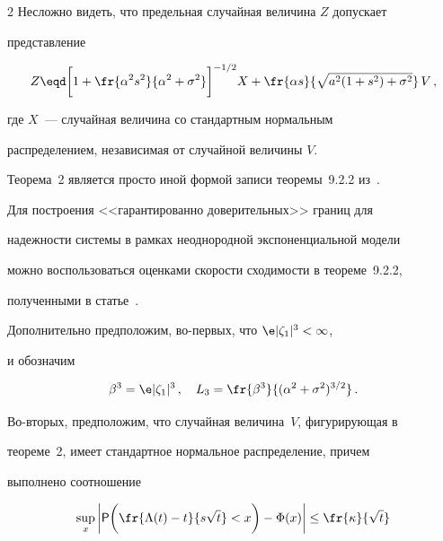 \begin{multicols}{2}
Несложно видеть, что предельная случайная величина $Z$ допускает


представление


$$


Z\eqd


\bigg[1+\fr{\alpha^2s^2}{\alpha^2+\sigma^2}\bigg]^{-1/2}


X+\fr{\alpha s}{\sqrt{a^2(1+s^2)+\sigma^2}}\, V\,,


$$


где $X$~--- случайная величина со стандартным нормальным


распределением, независимая от случайной величины $V$.





Теорема~2 является просто иной формой записи теоремы~9.2.2 из~\cite{8art}.





\smallskip





Для построения <<гарантированно доверительных>> границ для


надежности системы в рамках неоднородной экспоненциальной модели


можно воспользоваться оценками скорости сходимости в теореме~9.2.2,


полученными в статье~\cite{10art}.





Дополнительно предположим, во-первых, что $\e|\zeta_1|^3<\infty$,


и обозначим


$$


\beta^3 = \e|\zeta_1|^3\,,\ \ \ L_3 =


\fr{\beta^3}{(\alpha^2+\sigma^2)^{3/2}}\,.


$$


Во-вторых, предположим, что случайная величина~$V$, фигурирующая в


теореме~2, имеет стандартное нормальное распределение, причем


выполнено соотношение


\begin{equation}


\sup_x\bigg|{\sf P}\bigg(\fr{\Lambda(t)-t}{s\sqrt


t}<x\bigg)-\Phi(x)\bigg|\le\fr{\kappa}{\sqrt{t}}


\label{e7art}



\end{equation}
\end{multicols}
